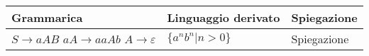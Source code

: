 \documentclass{standalone}
\begin{document}
\begin{tabularx}{\textwidth}{|X |X | X|}
	\toprule
		Grammarica & Linguaggio derivato & Spiegazione \\
    \hline
        $S \to aAB$ \newline 
        $aA \to aaAb$ \newline 
        $A \to \varepsilon$ 
        & 
        $\{a^n b^n |n>0\}$ 
        & 
        Spiegazione \\
    \bottomrule
\end{tabularx}
\end{document}
